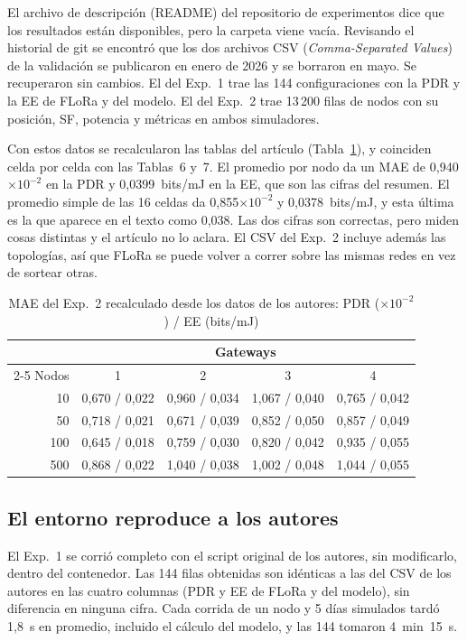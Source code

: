 \documentclass[conference,a4paper]{IEEEtran}
\begin{document}
El archivo de descripción (README) del repositorio de experimentos dice que los resultados están disponibles, pero la carpeta viene vacía. Revisando el historial de git se encontró que los dos archivos CSV (\emph{Comma-Separated Values}) de la validación se publicaron en enero de 2026 y se borraron en mayo. Se recuperaron sin cambios. El del Exp.~1 trae las 144 configuraciones con la PDR y la EE de FLoRa y del modelo. El del Exp.~2 trae 13\,200 filas de nodos con su posición, SF, potencia y métricas en ambos simuladores.

Con estos datos se recalcularon las tablas del artículo (Tabla~\ref{tab:exp2}), y coinciden celda por celda con las Tablas~6 y~7. El promedio por nodo da un MAE de 0,940$\times10^{-2}$ en la PDR y 0,0399~bits/mJ en la EE, que son las cifras del resumen. El promedio simple de las 16 celdas da 0,855$\times10^{-2}$ y 0,0378~bits/mJ, y esta última es la que aparece en el texto como 0,038. Las dos cifras son correctas, pero miden cosas distintas y el artículo no lo aclara. El CSV del Exp.~2 incluye además las topologías, así que FLoRa se puede volver a correr sobre las mismas redes en vez de sortear otras.

\begin{table}[t]
\centering
\caption{MAE del Exp.~2 recalculado desde los datos de los autores: PDR ($\times10^{-2}$) / EE (bits/mJ)}
\label{tab:exp2}
\footnotesize
\renewcommand{\arraystretch}{1.12}
\setlength{\tabcolsep}{4pt}
\begin{tabular}{@{}r cccc@{}}
\toprule
& \multicolumn{4}{c}{Gateways} \\ \cmidrule(l){2-5}
Nodos & 1 & 2 & 3 & 4 \\ \midrule
10  & 0,670 / 0,022 & 0,960 / 0,034 & 1,067 / 0,040 & 0,765 / 0,042 \\
50  & 0,718 / 0,021 & 0,671 / 0,039 & 0,852 / 0,050 & 0,857 / 0,049 \\
100 & 0,645 / 0,018 & 0,759 / 0,030 & 0,820 / 0,042 & 0,935 / 0,055 \\
500 & 0,868 / 0,022 & 1,040 / 0,038 & 1,002 / 0,048 & 1,044 / 0,055 \\
\bottomrule
\end{tabular}
\end{table}

\subsection{El entorno reproduce a los autores}

El Exp.~1 se corrió completo con el script original de los autores, sin modificarlo, dentro del contenedor. Las 144 filas obtenidas son idénticas a las del CSV de los autores en las cuatro columnas (PDR y EE de FLoRa y del modelo), sin diferencia en ninguna cifra.
Cada corrida de un nodo y 5 días simulados tardó 1,8~s en promedio, incluido el cálculo del modelo, y las 144 tomaron 4~min~15~s.
\end{document}
